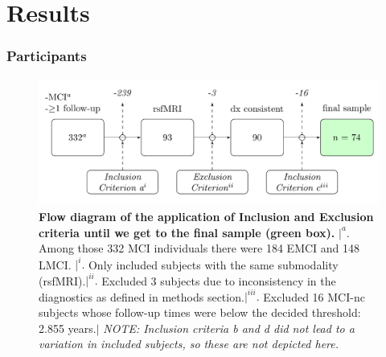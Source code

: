 \documentclass[a4paper,12pt]{elsarticle}  %
\begin{document}
\clearpage 
\part{Results}

	\section{Participants} \label{sec:participants_results_part}
	
	\begin{figure}[h]
		\centering
		\includegraphics[width=1\textwidth]{fig_tikz_diagramaInclusioExclusio_resultats.png}
		\caption{\textbf{Flow diagram of the application of Inclusion and Exclusion criteria until we get to the final sample (green box).} $| ^{a}.$ Among those 332 MCI individuals there were 184 EMCI and 148 LMCI. $| ^{i}.$ Only included subjects with the same submodality (rsfMRI).$| ^{ii}.$ Excluded 3 subjects due to inconsistency in the diagnostics as defined in methods section.$| ^{iii}.$ Excluded 16 MCI-nc subjects whose follow-up times were below the decided threshold: 2.855 years.$|$ \textit{NOTE: Inclusion criteria b and d did not lead to a variation in included subjects, so these are not depicted here.}}
		\label{fig:fig_tikz_diagramaInclusioExclusio_resultats}
	\end{figure}
\end{document}
